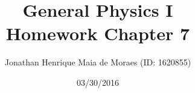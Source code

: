 \title{General Physics I \\ Homework Chapter 7}
\author{Jonathan Henrique Maia de Moraes (ID: 1620855)}
\date{03/30/2016}
\maketitle
